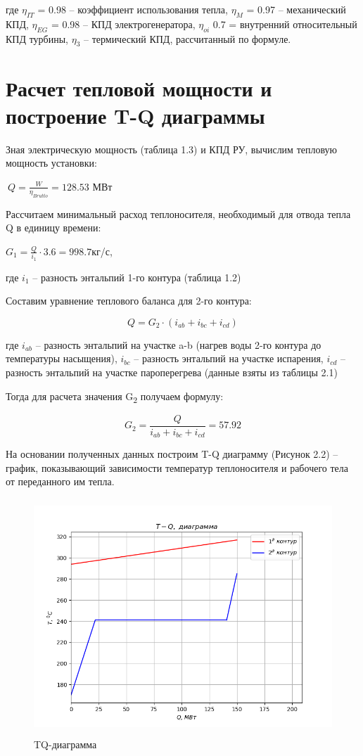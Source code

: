 где \(\eta_{IT}\) = 0.98 -- коэффициент использования тепла,
\(\eta_{M}\) = 0.97 -- механический КПД, \(\eta_{EG}\) = 0.98 -- КПД
электрогенератора, \(\eta_{oi}\) 0.7 = внутренний относительный
КПД турбины, \(\eta_{3}\) -- термический КПД, рассчитанный по формуле.

\section{Расчет тепловой мощности и построение T-Q диаграммы}

Зная электрическую мощность (таблица 1.3) и КПД РУ, вычислим тепловую
мощность установки:

\(\ Q =\frac{W}{\eta_{Brutto}} = 128.53\) МВт

Рассчитаем минимальный расход теплоносителя, необходимый для отвода
тепла Q в единицу времени:



\(G_1 = \frac{Q}{{i}_{1}} \cdot 3.6 = 998.7\)кг/с,

где \({i}_{1}\) -- разность энтальпий 1-го контура (таблица 1.2)

Составим уравнение теплового баланса для 2-го контура:

\begin{equation}
Q = G_2\cdot(i_{ab} + i_{bc} + i_{cd})
\end{equation}

где ${i}_{ab}$ -- разность энтальпий на участке a-b (нагрев
воды 2-го контура до температуры насыщения), ${i}_{bc}$ --
разность энтальпий на участке испарения, ${i}_{cd}$ -- разность
энтальпий на участке пароперегрева (данные взяты из таблицы 2.1)

Тогда для расчета значения G­\textsubscript{2} получаем формулу:

\begin{equation}
G_2 =\frac{Q}{{i}_{ab} + {i}_{bc} + {i}_{cd}} = 57.92
\end{equation}


На основании полученных данных построим T-Q диаграмму (Рисунок 2.2) --
график, показывающий зависимости температур теплоносителя и рабочего
тела от переданного им тепла.

\begin{figure}[!h]
\center
\includegraphics[width=4.56942in,height=3.48958in]{media/image7.png}
\caption{TQ-диаграмма}
\end{figure}

